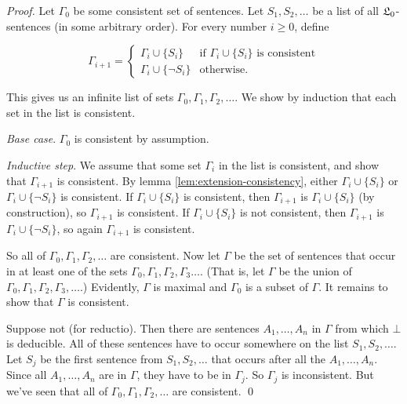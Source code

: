 \begin{proof}
  Let $\Gamma_0$ be some consistent set of sentences.
  Let $S_1,S_2,\ldots$ be a list of all $\mathfrak{L}_0$-sentences (in some arbitrary order).
  For every number $i\geq 0$, define

  \[
    \Gamma_{i+1} = \begin{cases} \Gamma_i \cup \{ S_i \} & \text{if $\Gamma_i \cup \{ S_i \}$ is consistent}\\
      \Gamma_i \cup \{ \neg S_i \} & \text{otherwise}.
    \end{cases}
  \]

  This gives us an infinite list of sets $\Gamma_0,\Gamma_1,\Gamma_2,\ldots$.
  We show by induction that each set in the list is consistent.

  \emph{Base case}. $\Gamma_0$ is consistent by assumption.

  \emph{Inductive step}.
  We assume that some set $\Gamma_i$ in the list is consistent,
  and show that $\Gamma_{i+1}$ is consistent.
  By lemma \ref{lem:extension-consistency},
  either $\Gamma_i \cup \{ S_i \}$ or $\Gamma_i \cup \{ \neg S_i \}$ is consistent.
  If $\Gamma_i \cup \{ S_i \}$ is consistent,
  then $\Gamma_{i+1}$ is $\Gamma_i \cup \{ S_i \}$ (by construction),
  so $\Gamma_{i+1}$ is consistent.
  If $\Gamma_i \cup \{ S_i \}$ is not consistent,
  then $\Gamma_{i+1}$ is $\Gamma_i \cup \{ \neg S_i \}$,
  so again $\Gamma_{i+1}$ is consistent.

  So all of $\Gamma_0,\Gamma_1,\Gamma_2,\ldots$ are consistent.
  Now let $\Gamma$ be the set of sentences that occur in at least one of the sets $\Gamma_{0},\Gamma_1, \Gamma_2,\Gamma_3\ldots$.
  (That is, let $\Gamma$ be the union of $\Gamma_{0},\Gamma_1,\Gamma_2,\Gamma_3,\ldots$.)
  Evidently, $\Gamma$ is maximal and $\Gamma_0$ is a subset of $\Gamma$.
  It remains to show that $\Gamma$ is consistent.

  Suppose not (for reductio).
  Then there are sentences $A_1,\ldots,A_n$ in $\Gamma$ from which $\bot$ is deducible.
  All of these sentences have to occur somewhere on the list $S_1,S_2,\ldots$.
  Let $S_j$ be the first sentence from $S_1,S_2,\ldots$ that occurs after
  all the $A_1,\ldots,A_n$.
  Since all $A_1,\ldots,A_n$ are in $\Gamma$,
  they have to be in $\Gamma_j$.
  So $\Gamma_j$ is inconsistent.
  But we've seen that all of $\Gamma_0,\Gamma_1,\Gamma_2,\ldots$ are consistent.
  \qed
\end{proof}


